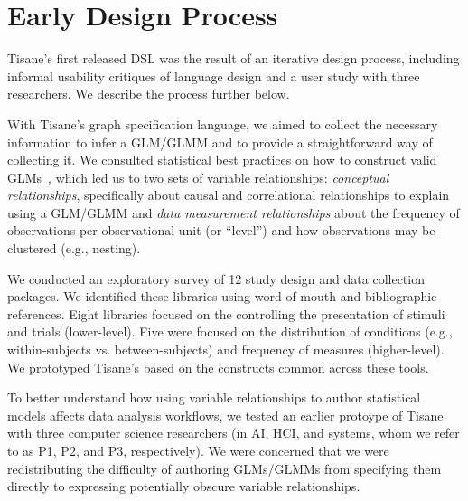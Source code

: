 \section{Early Design Process}
Tisane's first released DSL was the result of an iterative design process,
including informal usability critiques of language design and a user study
with three researchers. We describe the process further below. 


With Tisane's graph specification language, we aimed to collect the necessary
information to infer a GLM/GLMM and to provide a straightforward way of collecting
it. We consulted statistical best practices on how to construct valid
GLMs~\cite{kreft1998introducing,barr2013randomUpdated,barr2013random,mcelreath2020statistical},
which led us to two sets of variable relationships: \textit{conceptual
relationships}, specifically about causal and correlational relationships to
explain using a GLM/GLMM and \textit{data measurement relationships} about the
frequency of observations per observational unit (or ``level'') and how
observations may be clustered (e.g., nesting).

We conducted an exploratory survey of 12 study design and data collection
packages. We identified these libraries using word of mouth and bibliographic
references. Eight libraries %
focused on the controlling the presentation of stimuli and trials (lower-level).
Five were focused on the distribution of conditions (e.g., within-subjects vs.
between-subjects) and frequency of measures (higher-level). We prototyped
Tisane's \SDSL based on the constructs common across these tools. 

To better understand how using variable relationships to author statistical
models affects data analysis workflows, we tested an earlier protoype of Tisane
with three computer science researchers (in AI, HCI, and systems, whom we refer
to as P1, P2, and P3, respectively). We were concerned that we were
redistributing the difficulty of authoring GLMs/GLMMs from specifying them directly
to expressing potentially obscure variable relationships.


